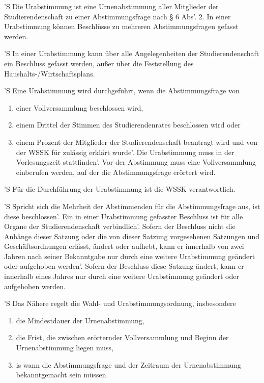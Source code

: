 \documentclass[fontsize=12pt,parskip=half]{scrartcl}
\begin{document}
\begin{contract}


  'S Die Urabstimmung ist eine Urnenabstimmung aller Mitglieder der
  Studierendenschaft zu einer Abstimmungsfrage nach § 6 Abs'. 2. In einer
  Urabstimmung können Beschlüsse zu mehreren Abstimmungsfragen gefasst werden.

  'S In einer Urabstimmung kann über alle Angelegenheiten der Studierendenschaft
  ein Beschluss gefasst werden, außer über die Feststellung des
  Haushalts-/Wirtschaftsplans.

  'S Eine Urabstimmung wird durchgeführt, wenn die Abstimmungsfrage von
  \begin{enumerate}[\qquad 1.]
  \item einer Vollversammlung beschlossen wird,
  \item einem Drittel der Stimmen des Studierendenrates beschlossen wird oder
  \item einem Prozent der Mitglieder der Studierendenschaft beantragt wird und
    von der WSSK für zulässig erklärt wurde'. Die Urabstimmung muss in der
    Vorlesungszeit stattfinden'. Vor der Abstimmung muss eine Vollversammlung
    einberufen werden, auf der die Abstimmungsfrage erörtert wird.
  \end{enumerate}

  'S Für die Durchführung der Urabstimmung ist die WSSK verantwortlich.

  'S Spricht sich die Mehrheit der Abstimmenden für die Abstimmungsfrage aus, ist
  diese beschlossen'. Ein in einer Urabstimmung gefasster Beschluss ist für alle
  Organe der Studierendenschaft verbindlich'. Sofern der Beschluss nicht die
  Anhänge dieser Satzung oder die von dieser Satzung vorgesehenen Satzungen und
  Geschäftsordnungen erlässt, ändert oder aufhebt, kann er innerhalb von zwei
  Jahren nach seiner Bekanntgabe nur durch eine weitere Urabstimmung geändert
  oder aufgehoben werden'. Sofern der Beschluss diese Satzung ändert, kann er
  innerhalb eines Jahres nur durch eine weitere Urabstimmung geändert oder
  aufgehoben werden.

  'S Das Nähere regelt die Wahl- und Urabstimmungsordnung, insbesondere
  \begin{enumerate}[\qquad 1.]
  \item die Mindestdauer der Urnenabstimmung,
  \item die Frist, die zwischen erörternder Vollversammlung und Beginn der
    Urnenabstimmung liegen muss,
  \item is wann die Abstimmungsfrage und der Zeitraum der Urnenabstimmung
    bekanntgemacht sein müssen.
  \end{enumerate}



\end{contract}
\end{document}
